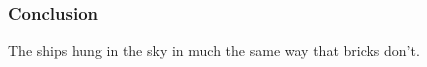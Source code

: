 \begin{frame}
  \frametitle{Conclusion}
  The ships hung in the sky in much the same way that bricks don't.
\end{frame}

